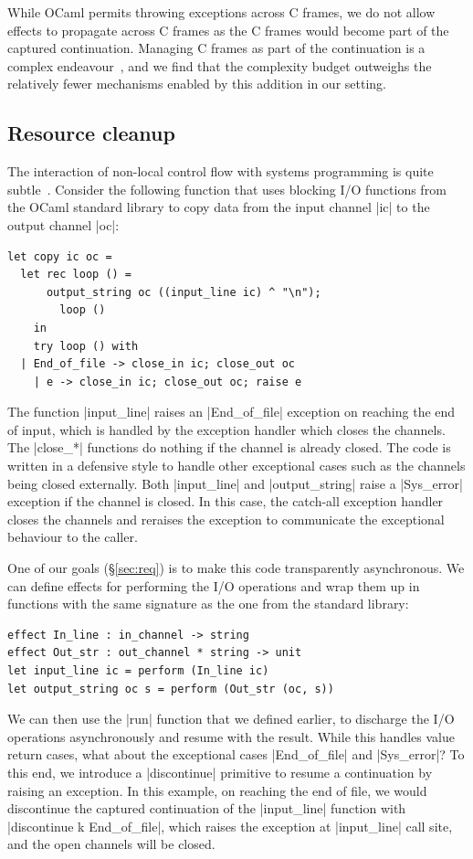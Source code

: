 \documentclass[sigplan,screen]{acmart}
\begin{document}
While OCaml permits throwing exceptions across C frames, we do not allow
effects to propagate across C frames as the C frames would become part of the
captured continuation. Managing C frames as part of the continuation is a
complex endeavour~\cite{Leijen17}, and we find that the complexity budget
outweighs the relatively fewer mechanisms enabled by this addition in our
setting.

\subsection{Resource cleanup}

The interaction of non-local control flow with systems programming is quite
subtle~\cite{TFP17, Leijen18}. Consider the following function that uses
blocking I/O functions from the OCaml standard library to copy data from the
input channel |ic| to the output channel |oc|:
\begin{lstlisting}
let copy ic oc =
  let rec loop () =
	  output_string oc ((input_line ic) ^ "\n");
		loop ()
	in
	try loop () with
  | End_of_file -> close_in ic; close_out oc
	| e -> close_in ic; close_out oc; raise e
\end{lstlisting}
The function |input_line| raises an |End_of_file| exception on reaching the end
of input, which is handled by the exception handler which closes the channels.
The |close_*| functions do nothing if the channel is already closed. The code
is written in a defensive style to handle other exceptional cases such as the
channels being closed externally. Both |input_line| and |output_string| raise
a |Sys_error| exception if the channel is closed. In this case, the catch-all
exception handler closes the channels and reraises the exception to communicate
the exceptional behaviour to the caller.

One of our goals (\S\ref{sec:req}) is to make this code transparently
asynchronous. We can define effects for performing the I/O operations and wrap
them up in functions with the same signature as the one from the standard
library:
\begin{lstlisting}
effect In_line : in_channel -> string
effect Out_str : out_channel * string -> unit
let input_line ic = perform (In_line ic)
let output_string oc s = perform (Out_str (oc, s))
\end{lstlisting}

We can then use the |run| function that we defined earlier, to discharge the
I/O operations asynchronously and resume with the result. While this handles
value return cases, what about the exceptional cases |End_of_file| and
|Sys_error|? To this end, we introduce a |discontinue| primitive to resume a
continuation by raising an exception. In this example, on reaching the end of
file, we would discontinue the captured continuation of the |input_line|
function with |discontinue k End_of_file|, which raises the exception at
|input_line| call site, and the open channels will be closed.
\end{document}
